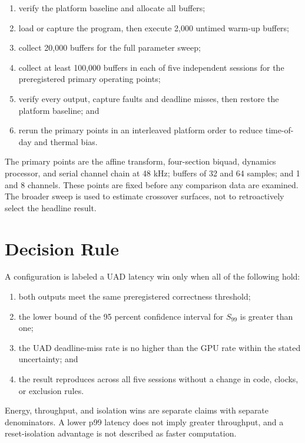 \documentclass[10pt,twocolumn,twoside]{article}
\begin{document}
\begin{enumerate}
  \item verify the platform baseline and allocate all buffers;
  \item load or capture the program, then execute 2,000 untimed warm-up
  buffers;
  \item collect 20,000 buffers for the full parameter sweep;
  \item collect at least 100,000 buffers in each of five independent sessions
  for the preregistered primary operating points;
  \item verify every output, capture faults and deadline misses, then restore
  the platform baseline; and
  \item rerun the primary points in an interleaved platform order to reduce
  time-of-day and thermal bias.
\end{enumerate}

The primary points are the affine transform, four-section biquad, dynamics
processor, and serial channel chain at 48 kHz; buffers of 32 and 64 samples;
and 1 and 8 channels. These points are fixed before any comparison data are
examined. The broader sweep is used to estimate crossover surfaces, not to
retroactively select the headline result.

\section{Decision Rule}

A configuration is labeled a UAD latency win only when all of the following
hold:

\begin{enumerate}
  \item both outputs meet the same preregistered correctness threshold;
  \item the lower bound of the 95 percent confidence interval for $S_{99}$ is
  greater than one;
  \item the UAD deadline-miss rate is no higher than the GPU rate within the
  stated uncertainty; and
  \item the result reproduces across all five sessions without a change in
  code, clocks, or exclusion rules.
\end{enumerate}

Energy, throughput, and isolation wins are separate claims with separate
denominators. A lower p99 latency does not imply greater throughput, and a
reset-isolation advantage is not described as faster computation.
\end{document}
